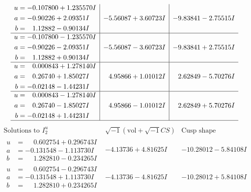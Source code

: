 \documentclass[1p]{elsarticle_modified}
\theoremstyle{definition}
\newcommand{\I}{\sqrt{-1}}
\begin{document}
$$\begin{array}{c|c|c}
\begin{aligned}
u &= -0.107800 + 1.235570 I \\
a &= -0.90226 + 2.09351 I \\
b &= \phantom{-}1.12882 - 0.90134 I\end{aligned}
 & -5.56087 + 3.60723 I & -9.83841 - 2.75515 I \\ \hline\begin{aligned}
u &= -0.107800 - 1.235570 I \\
a &= -0.90226 - 2.09351 I \\
b &= \phantom{-}1.12882 + 0.90134 I\end{aligned}
 & -5.56087 - 3.60723 I & -9.83841 + 2.75515 I \\ \hline\begin{aligned}
u &= \phantom{-}0.000843 + 1.278140 I \\
a &= \phantom{-}0.26740 + 1.85027 I \\
b &= -0.02148 - 1.44231 I\end{aligned}
 & \phantom{-}4.95866 + 1.01012 I & \phantom{-}2.62849 - 5.70276 I \\ \hline\begin{aligned}
u &= \phantom{-}0.000843 - 1.278140 I \\
a &= \phantom{-}0.26740 - 1.85027 I \\
b &= -0.02148 + 1.44231 I\end{aligned}
 & \phantom{-}4.95866 - 1.01012 I & \phantom{-}2.62849 + 5.70276 I\\
 \hline 
 \end{array}$$\newpage$$\begin{array}{c|c|c}  
\text{Solutions to }I^u_{2}& \I (\text{vol} + \sqrt{-1}CS) & \text{Cusp shape}\\
 \hline 
\begin{aligned}
u &= \phantom{-}0.602754 + 0.296743 I \\
a &= -0.131548 - 1.113730 I \\
b &= \phantom{-}1.282810 - 0.234265 I\end{aligned}
 & -4.13736 + 4.81625 I & -10.28012 - 5.84108 I \\ \hline\begin{aligned}
u &= \phantom{-}0.602754 - 0.296743 I \\
a &= -0.131548 + 1.113730 I \\
b &= \phantom{-}1.282810 + 0.234265 I\end{aligned}
 & -4.13736 - 4.81625 I & -10.28012 + 5.84108 I \\ \hline\begin{aligned}

\end{aligned}
\end{array}$$
\end{document}
